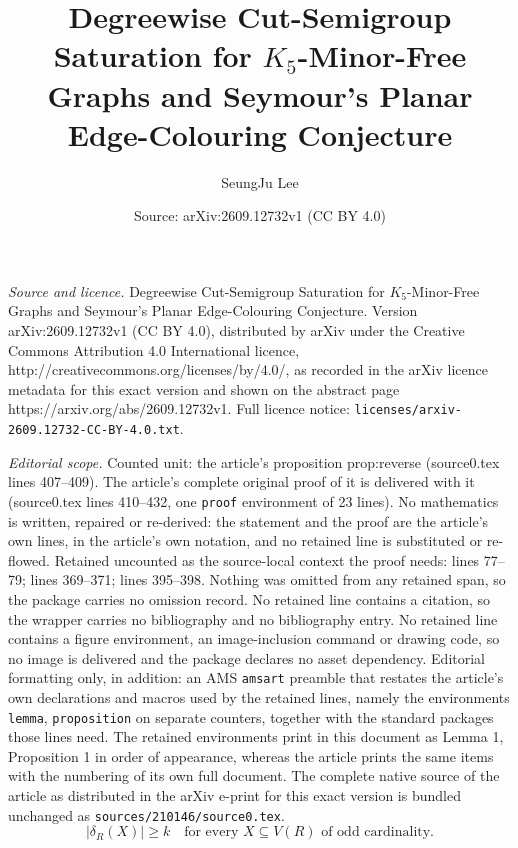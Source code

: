 \documentclass[10pt,a4paper]{amsart}
\title{Degreewise Cut-Semigroup Saturation for $K_5$-Minor-Free Graphs and Seymour's Planar Edge-Colouring Conjecture}
\author{SeungJu Lee}
\date{Source: arXiv:2609.12732v1 (CC BY 4.0)}
\begin{document}
\maketitle

\noindent\emph{Source and licence.} Degreewise Cut-Semigroup Saturation for $K_5$-Minor-Free Graphs and Seymour's Planar Edge-Colouring Conjecture. Version arXiv:2609.12732v1 (CC BY 4.0), distributed by arXiv under the Creative Commons Attribution 4.0 International licence, http://creativecommons.org/licenses/by/4.0/, as recorded in the arXiv licence metadata for this exact version and shown on the abstract page https://arxiv.org/abs/2609.12732v1. Full licence notice: \texttt{licenses/arxiv-2609.12732-CC-BY-4.0.txt}.\par\smallskip

\noindent\textit{Editorial scope.} Counted unit: the article's proposition prop:reverse (source0.tex lines 407--409). The article's complete original proof of it is delivered with it (source0.tex lines 410--432, one \texttt{proof} environment of 23 lines). No mathematics is written, repaired or re-derived: the statement and the proof are the article's own lines, in the article's own notation, and no retained line is substituted or re-flowed.  Retained uncounted as the source-local context the proof needs: lines 77--79; lines 369--371; lines 395--398.  Nothing was omitted from any retained span, so the package carries no omission record.  No retained line contains a citation, so the wrapper carries no bibliography and no bibliography entry.  No retained line contains a figure environment, an image-inclusion command or drawing code, so no image is delivered and the package declares no asset dependency.  Editorial formatting only, in addition: an AMS \texttt{amsart} preamble that restates the article's own declarations and macros used by the retained lines, namely the environments \texttt{lemma}, \texttt{proposition} on separate counters, together with the standard packages those lines need.  The retained environments print in this document as Lemma 1, Proposition 1 in order of appearance, whereas the article prints the same items with the numbering of its own full document.  The complete native source of the article as distributed in the arXiv e-print for this exact version is bundled unchanged as \texttt{sources/210146/source0.tex}.
\begin{equation}\label{eq:oddcut}
 |\delta_R(X)|\geq k\quad\text{for every }X\subseteq V(R)\text{ of odd cardinality}.
\end{equation}
\end{document}
